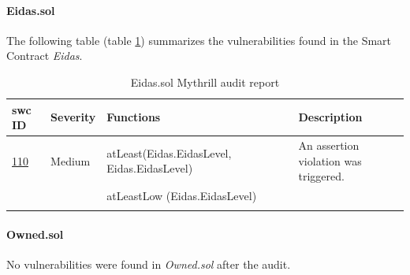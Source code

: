 \documentclass[a4paper, 12pt]{article} %
\begin{document}
            \paragraph{Eidas.sol}
                The following table (table \ref{tab:Eidas}) summarizes the vulnerabilities found in the Smart Contract \textit{Eidas}.
                \begin{longtable}{||p{0.1\linewidth} | p{0.11\linewidth} | p{0.50\linewidth} | p{0.30\linewidth}||}
                    \hline
                    \textbf{\acrshort{swc} ID} & \textbf{Severity} & \textbf{Functions} & \textbf{Description} \\ [0.5ex] 
                    \hline\hline
                    \href{https://swcregistry.io/docs/SWC-110}{110} & Medium & atLeast\newline (Eidas.EidasLevel, Eidas.EidasLevel) & An assertion violation was triggered.\\
                    \cline{3-3}
                    & & atLeastLow (Eidas.EidasLevel) &\\[1ex] 
                    \hline
                    \caption{Eidas.sol Mythrill audit report}
                    \label{tab:Eidas}
                \end{longtable}
                
            \paragraph{Owned.sol}
                No vulnerabilities were found in \textit{Owned.sol} after the audit.\\
\end{document}

